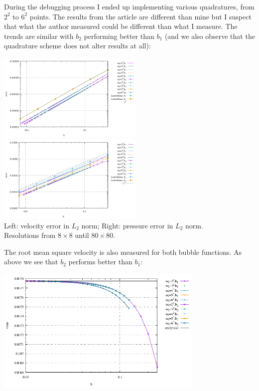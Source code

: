 During the debugging process I ended up 
implementing various quadratures, from $2^2$ to $6^2$ points. 
The results from the article are different than mine but I suspect that what the 
author measured could be different than what I measure. 
The trends are similar with $b_2$ performing better than $b_1$ (and 
we also observe that the quadrature scheme does not alter results at all): 

\begin{center}
\includegraphics[width=7cm]{python_codes/fieldstone_72/results/mms/errors_v}
\includegraphics[width=7cm]{python_codes/fieldstone_72/results/mms/errors_p}\\
{\captionfont Left: velocity error in $L_2$ norm; Right: pressure error in $L_2$ norm.\\
Resolutions from $8\times8$ until $80\times80$.}
\end{center}

The root mean square velocity is also measured for both bubble functions.
As above we see that $b_2$ performs better than $b_1$:
\begin{center}
\includegraphics[width=10cm]{python_codes/fieldstone_72/results/mms/vrms}
\end{center}




